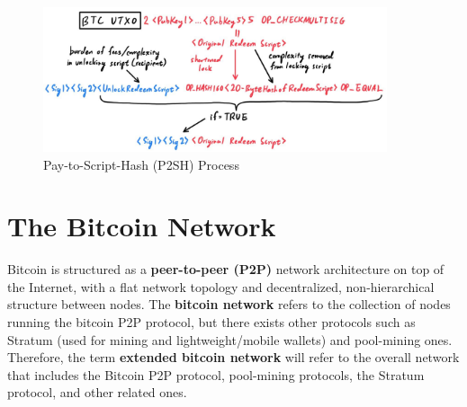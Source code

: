 \documentclass{article}
\begin{document}
    \begin{figure}[H]
    \centering
    \includegraphics[width=0.9\textwidth]{img/P2SH.jpg}
    \caption{Pay-to-Script-Hash (P2SH) Process}
    \end{figure}

\section{The Bitcoin Network}

    Bitcoin is structured as a \textbf{peer-to-peer (P2P)} network architecture on top of the Internet, with a flat network topology and decentralized, non-hierarchical structure between nodes. The \textbf{bitcoin network} refers to the collection of nodes running the bitcoin P2P protocol, but there exists other protocols such as Stratum (used for mining and lightweight/mobile wallets) and pool-mining ones. Therefore, the term \textbf{extended bitcoin network} will refer to the overall network that includes the Bitcoin P2P protocol, pool-mining protocols, the Stratum protocol, and other related ones.
\end{document}
